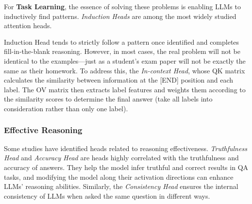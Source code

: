 \documentclass[12pt,letterpaper]{article}
\begin{document}
For \textbf{Task Learning}, the essence of solving these problems is enabling LLMs to inductively find patterns.
\textit{Induction Heads} are among the most widely studied attention heads.\citep{InductionHeads_22_TCT_Anthropic,Markov_24_arXiv_Harvard,FSL_24_ICML_UCL,InductionHead_24_arXiv_UoA} 

Induction Head tends to strictly follow a pattern once identified and completes fill-in-the-blank reasoning. However, in most cases, the real problem will not be identical to the examples—just as a student's exam paper will not be exactly the same as their homework. To address this, \citet{WordClassification_24_arXiv_UoM}  the \textit{In-context Head}, whose QK matrix calculates the similarity between information at the [END] position and each label. The OV matrix then extracts label features and weights them according to the similarity scores to determine the final answer (take all labels into consideration rather than only one label).

\subsubsection*{Effective Reasoning} \label{subsubsec:EffectiveReason}
Some studies have identified heads related to reasoning effectiveness. \textit{Truthfulness Head} \citep{ITI_23_NIPS_harvard, NL-ITI_24_arXiv-Samsung} and \textit{Accuracy Head} \citep{CrossLingual_24_SIGIR_UCAS,LoFiT_24_arXiv_UT} are heads highly correlated with the truthfulness and accuracy of answers. They help the model infer truthful and correct results in QA tasks, and modifying the model along their activation directions can enhance LLMs' reasoning abilities. Similarly, the \textit{Consistency Head} ensures the internal consistency of LLMs when asked the same question in different ways.\citep{SemanticConsistency_24_ACL_TJU}
\end{document}
